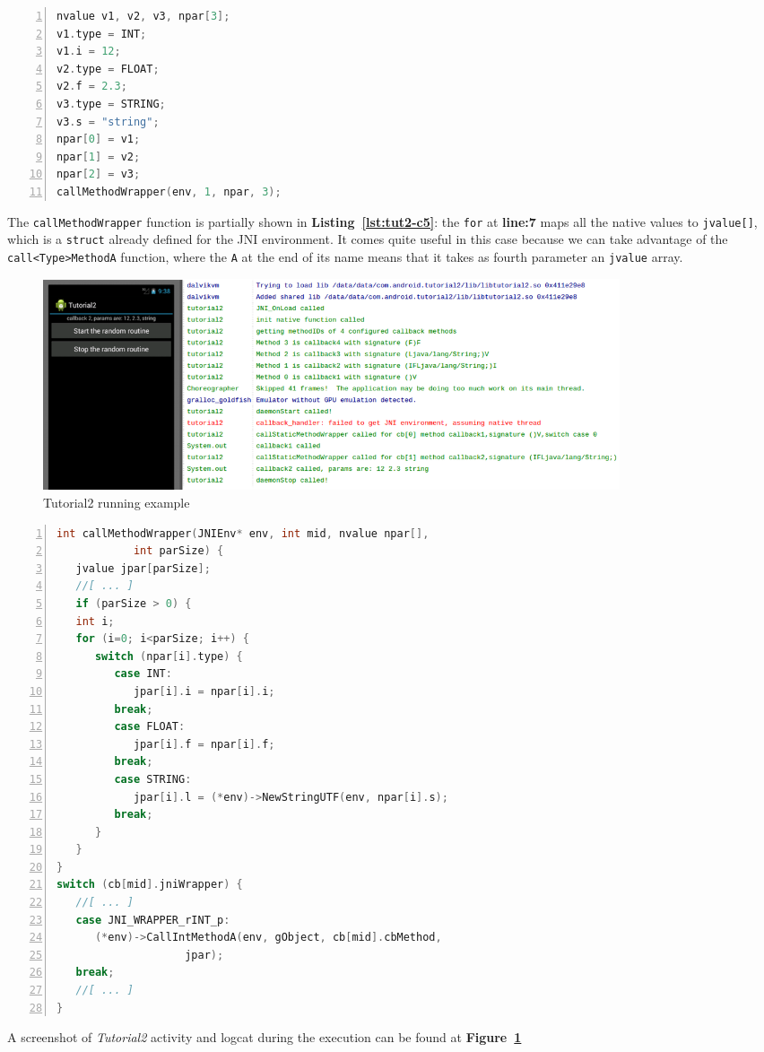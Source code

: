 \documentclass[a4paper,10pt]{article}
\newcommand{\keyword}[1]{\texttt{#1}}
\newcommand{\reff}[1]{\textbf{Figure~\ref{#1}}}
\newcommand{\refl}[1]{\textbf{Listing~\ref{#1}}}
\begin{document}
\begin{multicols}{2}
\begin{lstlisting}[language=C,
				   columns=fullflexible,
				   showstringspaces=false,
				   xleftmargin=15pt,
				   frame = l,
				   numbers=left,
				   commentstyle=\color{gray}\upshape,
				   caption=Part of tutorial2.c - method calls in randomCaller(),
				   label=lst:tut2-c4]
nvalue v1, v2, v3, npar[3];
v1.type = INT;
v1.i = 12;
v2.type = FLOAT;
v2.f = 2.3;
v3.type = STRING;
v3.s = "string";
npar[0] = v1;
npar[1] = v2;
npar[2] = v3;
callMethodWrapper(env, 1, npar, 3);
\end{lstlisting}
The \keyword{callMethodWrapper} function is partially shown in \refl{lst:tut2-c5}: the \keyword{for} at \textbf{line:7} maps all the native values to \keyword{jvalue[]}, which is a \keyword{struct} already defined for the JNI environment. It comes quite useful in this case because we can take advantage of the \keyword{call<Type>MethodA} function, where the \keyword{A} at the end of its name means that it takes as fourth parameter an \keyword{jvalue} array.

\begin{figure}[t]
 \includegraphics[width=17cm]{./figures/tut2-scr1.png}
 \caption{Tutorial2 running example}
 \label{fig:tut2-scr1}
\end{figure}
\begin{lstlisting}[language=C,
				   columns=fullflexible,
				   showstringspaces=false,
				   xleftmargin=15pt,
				   frame = l,
				   numbers=left,
				   commentstyle=\color{gray}\upshape,
				   caption=Part of tutorial2.c - callingMethodWrapper,
				   label=lst:tut2-c5]
int callMethodWrapper(JNIEnv* env, int mid, nvalue npar[],
			int parSize) {
   jvalue jpar[parSize];
   //[ ... ]
   if (parSize > 0) {
   int i;
   for (i=0; i<parSize; i++) {
      switch (npar[i].type) {
         case INT:
            jpar[i].i = npar[i].i;
         break;
         case FLOAT:
            jpar[i].f = npar[i].f;
         break;
         case STRING:
            jpar[i].l = (*env)->NewStringUTF(env, npar[i].s);
         break;
      }
   }
}
switch (cb[mid].jniWrapper) {
   //[ ... ]
   case JNI_WRAPPER_rINT_p:
      (*env)->CallIntMethodA(env, gObject, cb[mid].cbMethod,
      				jpar);
   break;
   //[ ... ]
}
\end{lstlisting}
A screenshot of \textit{Tutorial2} activity and logcat during the execution can be found at \reff{fig:tut2-scr1}


\end{multicols}
\end{document}

